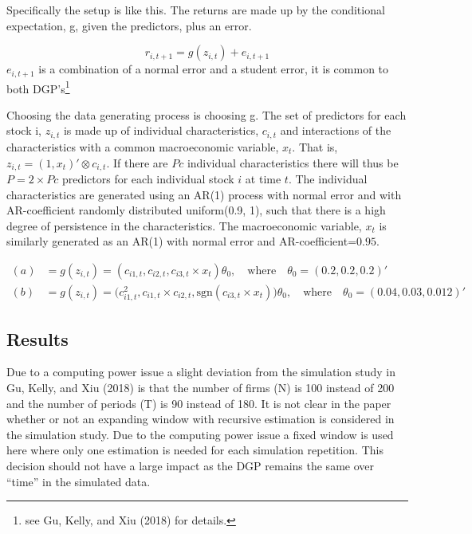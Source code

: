 \documentclass[]{article}
\let\rmarkdownfootnote\footnote%
\def\footnote{\protect\rmarkdownfootnote}
\newcommand{\sgn}{\mathrm{sgn}}
\begin{document}
Specifically the setup is like this. The returns are made up by the
conditional expectation, g, given the predictors, plus an error.

\[r_{i,t+1}= g(z_{i,t}) + e_{i, t+1}\] \(e_{i, t+1}\) is a combination
of a normal error and a student error, it is common to both
DGP's\footnote{see Gu, Kelly, and Xiu (2018) for details.}

Choosing the data generating process is choosing g. The set of
predictors for each stock i, \(z_{i,t}\) is made up of individual
characteristics, \(c_{i,t}\) and interactions of the characteristics
with a common macroeconomic variable, \(x_t\). That is,
\(z_{i,t} = (1, x_t)' \otimes c_{i,t}\). If there are \(Pc\) individual
characteristics there will thus be \(P = 2 \times Pc\) predictors for
each individual stock \(i\) at time \(t\). The individual
characteristics are generated using an AR(1) process with normal error
and with AR-coefficient randomly distributed uniform(0.9, 1), such that
there is a high degree of persistence in the characteristics. The
macroeconomic variable, \(x_t\) is similarly generated as an AR(1) with
normal error and AR-coefficient=\(0.95\).

\[
\begin{aligned}
(a) & = g(z_{i,t}) =  (c_{i1,t}, c_{i2,t}, c_{i3,t} \times x_t)\theta_0, \quad \mathrm{where} \quad \theta_0 = (0.2, 0.2, 0.2)'   \\
(b) & = g(z_{i,t}) = \big(c_{i1,t}^2, c_{i1,t} \times c_{i2,t}, \sgn(c_{i3,t} \times x_t) \big)\theta_0, \quad \mathrm{where} \quad \theta_0 = (0.04, 0.03, 0.012)' 
\end{aligned}
\]

\hypertarget{results}{%
\subsection{Results}\label{results}}

Due to a computing power issue a slight deviation from the simulation
study in Gu, Kelly, and Xiu (2018) is that the number of firms (N) is
100 instead of 200 and the number of periods (T) is 90 instead of 180.
It is not clear in the paper whether or not an expanding window with
recursive estimation is considered in the simulation study. Due to the
computing power issue a fixed window is used here where only one
estimation is needed for each simulation repetition. This decision
should not have a large impact as the DGP remains the same over ``time''
in the simulated data.
\end{document}
